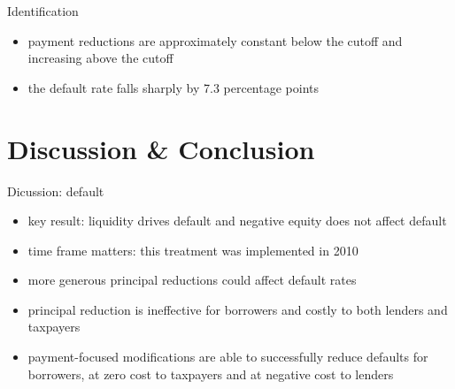 \begin{frame}{Identification}
    \begin{itemize}
        \item payment reductions are approximately constant below the cutoff and increasing above the cutoff
        \item the default rate falls sharply by 7.3 percentage points
        \begin{figure}
            \centering
            \hspace{1cm}
        \end{figure}
    \end{itemize}
\end{frame}

\section{Discussion \& Conclusion}
\begin{frame}{Dicussion: default}
    \begin{itemize}
        \item key result: liquidity drives default and negative equity does not affect default
        \item time frame matters: this treatment was implemented in 2010
        \item more generous principal reductions could affect default rates
        \item principal reduction is ineffective for borrowers and costly to both lenders and taxpayers
        \item payment-focused modifications are able to successfully reduce defaults for borrowers, at zero cost to taxpayers and at negative cost to lenders
    \end{itemize}
\end{frame}

